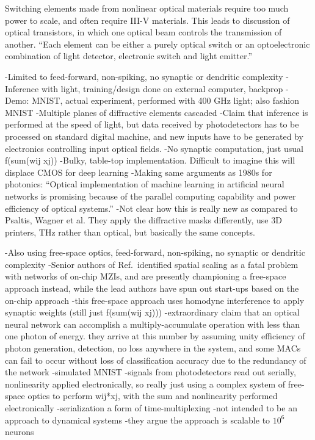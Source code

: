 \vspace{3em}
Switching elements made from nonlinear optical materials require too much power to scale, and often require III-V materials. This leads to discussion of optical transistors, in which one optical beam controls the transmission of another. ``Each element can be either a purely optical switch or an optoelectronic combination of light detector, electronic switch and light emitter.'' \cite{abps1987}

\vspace{3em}
\cite{liri2018}
-Limited to feed-forward, non-spiking, no synaptic or dendritic complexity
-Inference with light, training/design done on external computer, backprop
-Demo: MNIST, actual experiment, performed with 400 GHz light; also fashion MNIST
-Multiple planes of diffractive elements cascaded
-Claim that inference is performed at the speed of light, but data received by photodetectors has to be processed on standard digital machine, and new inputs have to be generated by electronics controlling input optical fields.
-No synaptic computation, just usual f(sum(wij xj))
-Bulky, table-top implementation. Difficult to imagine this will displace CMOS for deep learning
-Making same arguments as 1980s for photonics: ``Optical implementation of machine learning in artificial neural networks is promising because of the parallel computing capability and power efficiency of optical systems.''
-Not clear how this is really new as compared to Psaltis, Wagner et al. They apply the diffractive masks differently, use 3D printers, THz rather than optical, but basically the same concepts.

\cite{hasl2018}
-Also using free-space optics, feed-forward, non-spiking, no synaptic or dendritic complexity
-Senior authors of Ref.\,\cite{shha2016} identified spatial scaling as a fatal problem with networks of on-chip MZIs, and are presently championing a free-space approach instead, while the lead authors have spun out start-ups based on the on-chip approach
-this free-space approach uses homodyne interference to apply synaptic weights (still just f(sum(wij xj)))
-extraordinary claim that an optical neural network can accomplish a multiply-accumulate operation with less than one photon of energy. they arrive at this number by assuming unity efficiency of photon generation, detection, no loss anywhere in the system, and some MACs can fail to occur without loss of classification accuracy due to the redundancy of the network
-simulated MNIST
-signals from photodetectors read out serially, nonlinearity applied electronically, so really just using a complex system of free-space optics to perform wij*xj, with the sum and nonlinearity performed electronically
-serialization a form of time-multiplexing
-not intended to be an approach to dynamical systems
-they argue the approach is scalable to $10^6$ neurons

